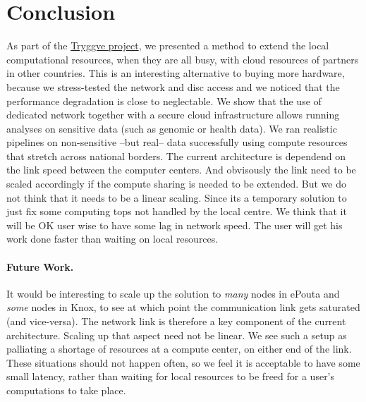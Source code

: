 \section{Conclusion}
\label{section:conclusion}

As part of the \href{https://wiki.neic.no/wiki/Tryggve}{Tryggve
  project}, we presented a method to extend the local computational
resources, when they are all busy, with cloud resources of partners in
other countries.
%
This is an interesting alternative to buying more hardware, because we
stress-tested the network and disc access and we noticed that the
performance degradation is close to neglectable.
%
We show that the use of dedicated network together with a secure cloud
infrastructure allows running analyses on sensitive data (such as
genomic or health data).
%
We ran realistic pipelines on non-sensitive --but real-- data
successfully using compute resources that stretch across national
borders.
%
The current architecture is dependend on the link speed between the computer centers. And obvisously the link need to be scaled accordingly if the compute sharing is needed to be extended. But we do not think that it needs to be a linear scaling. Since its a temporary solution to just fix some computing tops not handled by the local centre. We think that it will be OK user wise to have some lag in network speed. The user will get his work done faster than waiting on local resources. 
%

\paragraph{Future Work.}
%
It would be interesting to scale up the solution to \emph{many} nodes
in ePouta and \emph{some} nodes in Knox, to see
at which point the communication link gets saturated (and vice-versa).
%
The network link is therefore a key component of the current
architecture.
%
Scaling up that aspect need not be linear. We see such a setup as
palliating a shortage of resources at a compute center, on either end
of the link. These situations should not happen often, so we feel it
is acceptable to have some small latency, rather than waiting for
local resources to be freed for a user's computations to take place.

